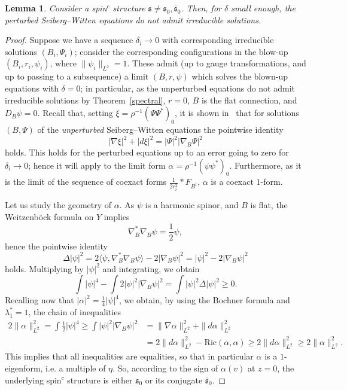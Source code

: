 \documentclass[11pt]{article}
\newtheorem{lemm}[theo]{Lemma}
\theoremstyle{definition}
\numberwithin{equation}{section}
\numberwithin{figure}{section}
\numberwithin{table}{section}
\newcommand{\spin}{\mathfrak{s}}
\begin{document}
\begin{lemm}
Consider a spin$^c$ structure $\spin\neq \spin_0, \bar{\spin}_0$. Then, for $\delta$ small enough, the perturbed Seiberg--Witten equations do not admit irreducible solutions.
\end{lemm}

\begin{proof}
Suppose we have a sequence $\delta_i\rightarrow 0$ with corresponding irreducible solutions $(B_i,\Psi_i)$; consider the corresponding configurations in the blow-up $(B_i,r_i,\psi_i)$, where $\|\psi_i\|_{L^2}=1$. These admit (up to gauge transformations, and up to passing to a subsequence) a limit $(B,r,\psi)$ which solves the blown-up equations with $\delta=0$; in particular, as the unperturbed equations do not admit irreducible solutions by Theorem~\ref{spectral}, $r=0$, $B$ is the flat connection, and $D_B\psi=0$. Recall that, setting $\xi=\rho^{-1}(\Psi\Psi^*)_0$, it is shown in~\cite[Proposition~$1$]{LL} that for solutions $(B,\Psi)$ of the \emph{unperturbed} Seiberg--Witten equations the pointwise identity
\[
|\nabla\xi|^2+|d\xi|^2=|\Psi|^2|\nabla_B\Psi|^2
\]
holds. This holds for the perturbed equations up to an error going to zero for $\delta_i\rightarrow 0$; hence it will apply to the limit form $\alpha=\rho^{-1}(\psi\psi^*)_0$. Furthermore, as it is the limit of the sequence of coexact forms $\frac{1}{2r_i^2}\ast F_{B^t}$, $\alpha$ is a coexact $1$-form.


Let us study the geometry of $\alpha$. As $\psi$ is a harmonic spinor, and $B$ is flat, the Weitzenb\"ock formula on $Y$ implies
\[
\nabla_B^*\nabla_B \psi=\frac{1}{2}\psi,
\]
hence the pointwise identity
\[
\Delta|\psi|^2=2\langle \psi, \nabla_B^*\nabla_B \psi\rangle-2|\nabla_B\psi|^2=| \psi|^2-2|\nabla_B\psi|^2
\]
holds. Multiplying by $|\psi|^2$ and integrating, we obtain
\[
\int | \psi|^4-\int 2| \psi|^2|\nabla_B\psi|^2=\int | \psi|^2\Delta|\psi|^2\geq0.
\]
Recalling now that $|\alpha|^2=\frac{1}{4}|\psi|^4$, we obtain, by using the Bochner formula and $\lambda_1^*=1$, the chain of inequalities
\begin{align*}
2\|\alpha\|^2_{L^2}=\int\frac{1}{2}|\psi|^4\geq \int | \psi|^2|\nabla_B\psi|^2&=\|\nabla\alpha\|^2_{L^2}+\|d\alpha\|^2_{L^2}\\
&=2\|d\alpha\|^2_{L^2}-\mathrm{Ric}(\alpha,\alpha)\geq2\|d\alpha\|^2_{L^2}\geq 2\|\alpha\|^2_{L^2}.
\end{align*}
This implies that all inequalities are equalities, so that in particular $\alpha$ is a $1$-eigenform, i.e. a multiple of $\eta$. So, according to the sign of $\alpha(v)$ at $z=0$, the underlying spin$^c$ structure is either $\spin_0$ or its conjugate $\bar{\spin}_0$.
\end{proof}
\end{document}
